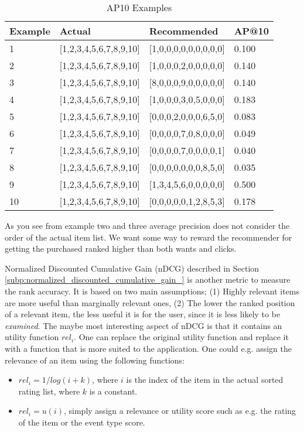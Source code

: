 \begin{table}[H]
\label{table:ap}
\centering
\begin{tabular}{*{4}l}
\toprule
Example 	& 	Actual					& 	Recommended					&	AP@10   \\ \midrule
1			& [1,2,3,4,5,6,7,8,9,10]	&	[1,0,0,0,0,0,0,0,0,0]		&	0.100  \\
2			& [1,2,3,4,5,6,7,8,9,10]	&	[1,0,0,0,2,0,0,0,0,0]		&	0.140  \\
3			& [1,2,3,4,5,6,7,8,9,10]	&	[8,0,0,0,9,0,0,0,0,0]		&	0.140  \\
4			& [1,2,3,4,5,6,7,8,9,10]	&	[1,0,0,0,3,0,5,0,0,0]		&	0.183  \\
5			& [1,2,3,4,5,6,7,8,9,10]	&	[0,0,0,2,0,0,0,6,5,0]		&	0.083  \\
6			& [1,2,3,4,5,6,7,8,9,10]	&	[0,0,0,0,7,0,8,0,0,0]		&	0.049  \\
7			& [1,2,3,4,5,6,7,8,9,10]	&	[0,0,0,0,7,0,0,0,0,1]		&	0.040  \\
8			& [1,2,3,4,5,6,7,8,9,10]	&	[0,0,0,0,0,0,0,8,5,0]		&	0.035  \\
9			& [1,2,3,4,5,6,7,8,9,10]	&	[1,3,4,5,6,0,0,0,0,0]		&	0.500  \\
10			& [1,2,3,4,5,6,7,8,9,10]	&	[0,0,0,0,0,1,2,8,5,3]		&	0.178  \\
\bottomrule
\end{tabular}
\caption{AP\@10 Examples}
\end{table}

As you see from example two and three average precision does not consider the order of the actual item list. We want some way to
reward the recommender for getting the purchased ranked higher than both wants and clicks.


Normalized Discounted Cumulative Gain (nDCG) described in Section \ref{subp:normalized_discounted_cumulative_gain_} is another metric to
measure the rank accuracy. It is based on two main assumptions; (1) Highly relevant items are more useful than marginally relevant ones,
(2) The lower the ranked position of a relevant item, the less useful it is for the user, since it is less likely to be \emph{examined}.
The maybe most interesting aspect of nDCG is that it contains an utility function $rel_i$. One can replace the original utility function
and replace it with a function that is more suited to the application. One could e.g. assign the relevance of an item using
the following functions:

\begin{itemize}
\item $rel_i = 1/log(i+k)$, where $i$ is the index of the item in the actual sorted rating list, where $k$ is a constant.
\item $rel_i = u(i)$, simply assign a relevance or utility score such as e.g. the rating of the item or the event type score.
\end{itemize}

